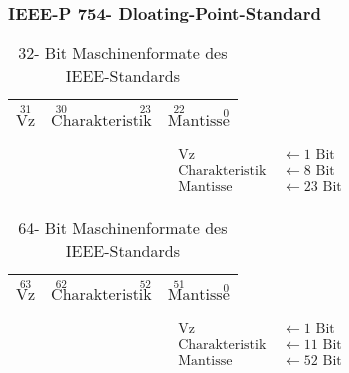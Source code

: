 \documentclass[a4paper]{scrartcl}
\begin{document}
			\subsubsection{IEEE-P 754- Dloating-Point-Standard}
			\begin{table}[h]
				\centering
				\begin{tabular}{|c|c|c|}
					\hline
					 \(\overset{31}{\text{Vz}} \)& \(\overset{30}{\text{Ch}}\text{arakterist} \overset{23}{\text{ik}}\) & \(\overset{22}{\text{Ma}} \text{ntiss} \overset{0}{\text{e}}\) \\ \hline
				\end{tabular}
				\caption{32- Bit Maschinenformate des IEEE-Standards}
			\end{table}
		
		\begin{align*}
		\text{Vz } &\gets 1 \text{ Bit} \\
		\text{Charakteristik } &\gets 8 \text{ Bit}\\
		\text{Mantisse } &\gets  23 \text{ Bit}\\
		\end{align*}
						
		\begin{table}[h]
			\centering
			\begin{tabular}{|c|c|c|}
				\hline
				\(\overset{63}{\text{Vz}} \)& \(\overset{62}{\text{Ch}}\text{arakterist} \overset{52}{\text{ik}}\) & \(\overset{51}{\text{Ma}} \text{ntiss} \overset{0}{\text{e}}\) \\ \hline
			\end{tabular}
			\caption{64- Bit Maschinenformate des IEEE-Standards}
		\end{table}
	
	\begin{align*}
	\text{Vz } &\gets 1 \text{ Bit} \\
	\text{Charakteristik } &\gets 11 \text{ Bit}\\
	\text{Mantisse } &\gets  52 \text{ Bit}\\
	\end{align*}
	
\end{document}
